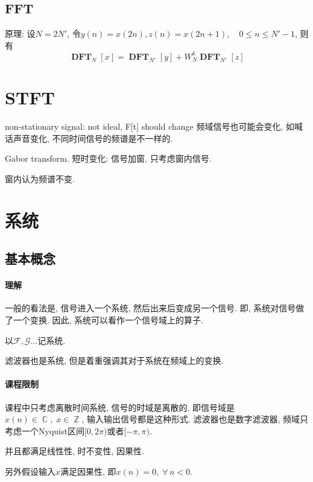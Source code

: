 \documentclass{ctexart}
\DeclareMathOperator{\DFT}{\mathbf{DFT}}
\DeclareMathOperator{\Cset}{\mathbb{C}}
\DeclareMathOperator{\Zset}{\mathbb{Z}}
\begin{document}
\subsection{FFT}
    原理: 设$N = 2N'$, 令$y(n) = x(2n), z(n) = x(2n+1),\quad 0 \le n \le N' - 1$, 则有\[
        \DFT_{N} [x] = \DFT_{N'} [y] + W_N^k \DFT_{N'} [z] \]

\section{STFT}
    non-stationary signal: not ideal, F[t] should change
        频域信号也可能会变化, 如喊话声音变化, 不同时间信号的频谱是不一样的.\par

    Gabor transform. 短时变化: 信号加窗, 只考虑窗内信号.\par
    窗内认为频谱不变.\par

\section{系统}
\subsection{基本概念}
\paragraph{理解}
    一般的看法是, 信号进入一个系统, 然后出来后变成另一个信号. 即, 系统对信号做了一个变换.
    因此, 系统可以看作一个信号域上的算子.\par
    以$\mathcal{F}, \mathcal{G}\ldots$记系统.\par
    滤波器也是系统, 但是着重强调其对于系统在频域上的变换.
\paragraph{课程限制}
    课程中只考虑离散时间系统, 信号的时域是离散的.
    即信号域是$x(n) \in \Cset,\; x\in \Zset$, 输入输出信号都是这种形式.
    滤波器也是数字滤波器, 频域只考虑一个Nyquist区间$[0, 2\pi)$或者$[-\pi, \pi)$.\par
    并且都满足线性性, 时不变性, 因果性.\par
    另外假设输入$x$满足因果性, 即$x(n) = 0, \;\forall\, n < 0$.
\end{document}
